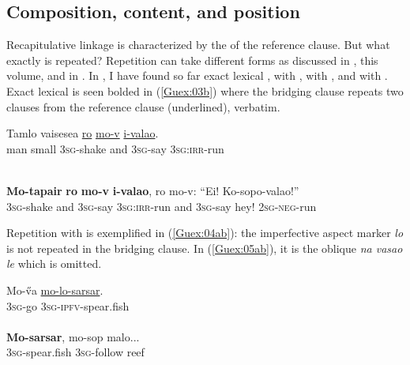\documentclass[output=paper]{LSP/langsci}
\begin{document}
\subsection{Composition, content, and position} 
\label{Gusec:Composition}
Recapitulative linkage is characterized by the  of the reference clause. But what exactly is repeated? Repetition can take different forms as discussed in \citeauthor{guerin18}, this volume, and in \citet[][224]{brown.2000}. In , I have found so far exact lexical ,  with , with , and  with .  Exact lexical  is seen bolded in (\ref{Guex:03b}) where the bridging clause repeats two clauses from the reference clause (underlined), verbatim. 

\begin{exe}
\ex \label{Guex:03ab}
\begin{xlist}
\ex \label{Guex:03a}
\gll Tamlo   vaisesea   \underline{}   \underline{ro}    \underline{mo-v}       \underline{i-valao}.\\
man     small      \textsc{3sg}-shake    and   \textsc{3sg}-say   \textsc{3sg}:\textsc{irr}-run\\
\glt {}\\

\pagebreak

\ex \label{Guex:03b}
\gll \textbf{Mo-tapair}   \textbf{ro}     \textbf{mo-v}       \textbf{i-valao}, ro mo-v:     ``Ei!  Ko-sopo-valao!''\\     	       
    \textsc{3sg}-shake    and   \textsc{3sg}-say   \textsc{3sg:irr}-run    and \textsc{3sg}-say   hey!  \textsc{2sg-neg}-run\\
\glt {} 
\end{xlist}
\end{exe}

Repetition with  is exemplified in (\ref{Guex:04ab}): the imperfective aspect marker \textit{lo} is not repeated in the bridging clause. In (\ref{Guex:05ab}), it is the oblique \textit{na vasao le} which is omitted.

\begin{exe}
\ex \label{Guex:04ab}
\begin{xlist}
\ex \label{Guex:04a}
\gll Mo-\H{v}a \underline{mo-lo-sarsar}.\\
\textsc{3sg}-go     \textsc{3sg}-\textsc{ipfv}-spear.fish\\
\glt {}\\
\ex \label{Guex:04b}
\gll \textbf{Mo-sarsar},   mo-sop         malo...\\     	       
    \textsc{3sg}-spear.fish    \textsc{3sg}-follow   reef \\
\glt {} 
\end{xlist}
\end{exe}
\end{document}

